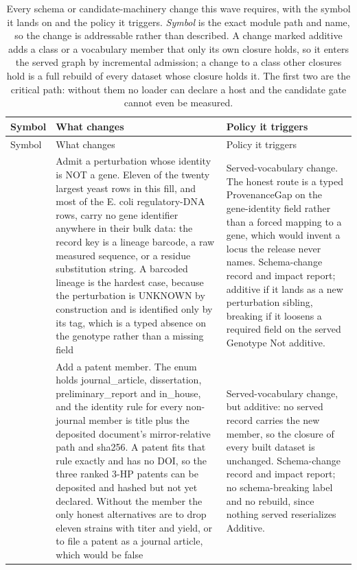 \begingroup
\footnotesize
\begin{longtable}{@{}L{50mm} L{48mm} L{74mm}@{}}
\caption[]{Every schema or candidate-machinery change this wave requires, with the
symbol it lands on and the policy it triggers. \emph{Symbol} is the exact module path
and name, so the change is addressable rather than described. A change marked additive
adds a class or a vocabulary member that only its own closure holds, so it enters the
served graph by incremental admission; a change to a class other closures hold is a full
rebuild of every dataset whose closure holds it. The first two are the critical path:
without them no loader can declare a host and the candidate gate cannot even be
measured.}
\label{tab:schema}\\
\toprule
Symbol & What changes & Policy it triggers \\
\midrule
\endfirsthead
\toprule
Symbol & What changes & Policy it triggers \\
\midrule
\endhead
\bottomrule
\endfoot
{} & Admit a perturbation whose identity is NOT a gene. Eleven of the twenty largest yeast rows in this fill, and most of the E. coli regulatory-DNA rows, carry no gene identifier anywhere in their bulk data: the record key is a lineage barcode, a raw measured sequence, or a residue substitution string. A barcoded lineage is the hardest case, because the perturbation is UNKNOWN by construction and is identified only by its tag, which is a typed absence on the genotype rather than a missing field & Served-vocabulary change. The honest route is a typed ProvenanceGap on the gene-identity field rather than a forced mapping to a gene, which would invent a locus the release never names. Schema-change record and impact report; additive if it lands as a new perturbation sibling, breaking if it loosens a required field on the served Genotype Not additive. \\
\addlinespace[5pt]
 & Add a patent member. The enum holds journal\_article, dissertation, preliminary\_report and in\_house, and the identity rule for every non-journal member is title plus the deposited document's mirror-relative path and sha256. A patent fits that rule exactly and has no DOI, so the three ranked 3-HP patents can be deposited and hashed but not yet declared. Without the member the only honest alternatives are to drop eleven strains with titer and yield, or to file a patent as a journal article, which would be false & Served-vocabulary change, but additive: no served record carries the new member, so the closure of every built dataset is unchanged. Schema-change record and impact report; no schema-breaking label and no rebuild, since nothing served reserializes Additive. \\

\end{longtable}
